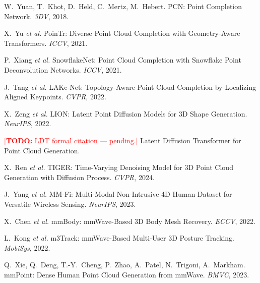 \documentclass{article}
\newcommand{\todo}[1]{\textcolor{red}{[\textbf{TODO:} #1]}}
\begin{document}
{\small
\begin{enumerate}[label={[\arabic*]},leftmargin=2em,itemsep=2pt]
  \item\label{ref:pcn}
        W.\ Yuan, T.\ Khot, D.\ Held, C.\ Mertz, M.\ Hebert.
        PCN: Point Completion Network. \emph{3DV}, 2018.
  \item\label{ref:pointr}
        X.\ Yu \emph{et al.}
        PoinTr: Diverse Point Cloud Completion with Geometry-Aware Transformers.
        \emph{ICCV}, 2021.
  \item\label{ref:snowflake}
        P.\ Xiang \emph{et al.}
        SnowflakeNet: Point Cloud Completion with Snowflake Point Deconvolution
        Networks. \emph{ICCV}, 2021.
  \item\label{ref:lakenet}
        J.\ Tang \emph{et al.}
        LAKe-Net: Topology-Aware Point Cloud Completion by Localizing Aligned
        Keypoints. \emph{CVPR}, 2022.
  \item\label{ref:lion}
        X.\ Zeng \emph{et al.}
        LION: Latent Point Diffusion Models for 3D Shape Generation.
        \emph{NeurIPS}, 2022.
  \item\label{ref:ldt}
        \todo{LDT formal citation --- pending.}
        Latent Diffusion Transformer for Point Cloud Generation.
  \item\label{ref:tiger}
        X.\ Ren \emph{et al.}
        TIGER: Time-Varying Denoising Model for 3D Point Cloud Generation with
        Diffusion Process. \emph{CVPR}, 2024.
  \item\label{ref:mmfi}
        J.\ Yang \emph{et al.}
        MM-Fi: Multi-Modal Non-Intrusive 4D Human Dataset for Versatile Wireless
        Sensing. \emph{NeurIPS}, 2023.
  \item\label{ref:mmbody}
        X.\ Chen \emph{et al.}
        mmBody: mmWave-Based 3D Body Mesh Recovery. \emph{ECCV}, 2022.
  \item\label{ref:radarhd}
        L.\ Kong \emph{et al.}
        m3Track: mmWave-Based Multi-User 3D Posture Tracking.
        \emph{MobiSys}, 2022.
  \item\label{ref:mmpoint}
        Q.\ Xie, Q.\ Deng, T.-Y.\ Cheng, P.\ Zhao, A.\ Patel, N.\ Trigoni, A.\ Markham.
        mmPoint: Dense Human Point Cloud Generation from mmWave.
        \emph{BMVC}, 2023.
\end{enumerate}
}

\newpage

\end{document}
